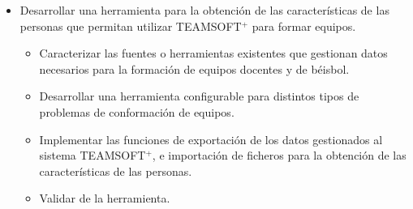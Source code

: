 \begin{itemize}
	\item Desarrollar una herramienta para la obtención de las características de las personas que permitan utilizar TEAMSOFT$^+$ para formar equipos.
		\begin{itemize}
			\item Caracterizar las fuentes o herramientas existentes que gestionan datos necesarios para la formación de equipos docentes y de béisbol.
			\item Desarrollar una herramienta configurable para distintos tipos de problemas de conformación de equipos.
			\item Implementar las funciones de exportación de los datos gestionados al sistema TEAMSOFT$^+$, e importación de ficheros para la obtención de las características de las personas.
			\item Validar de la herramienta.
		\end{itemize}
\end{itemize}



